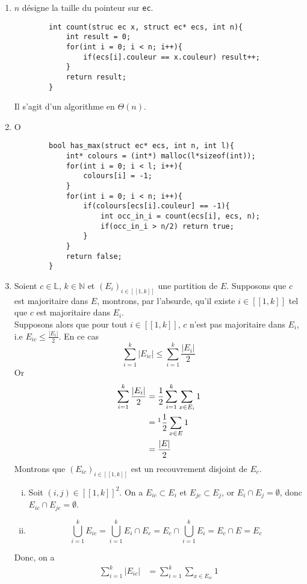 \documentclass[10pt]{article}
\newcommand{\f}[1]{\texttt{#1}}
\def\N{\mathbb N}
\def\L{\mathbb L}
\begin{document}
	\begin{enumerate}[start=9,label={\bfseries \arabic*}]
		\item $n$ désigne la taille du pointeur sur \f{ec}.


		\begin{lstlisting}
		int count(struc ec x, struct ec* ecs, int n){
			int result = 0;
			for(int i = 0; i < n; i++){
				if(ecs[i].couleur == x.couleur) result++;
			}
			return result;
		}
		\end{lstlisting}
		Il s'agit d'un algorithme en $\Theta(n)$.
		\item O
		\begin{lstlisting}
		bool has_max(struct ec* ecs, int n, int l){
			int* colours = (int*) malloc(l*sizeof(int));
			for(int i = 0; i < l; i++){
				colours[i] = -1;
			}
			for(int i = 0; i < n; i++){
				if(colours[ecs[i].couleur] == -1){
					int occ_in_i = count(ecs[i], ecs, n);
					if(occ_in_i > n/2) return true;
				}
			}
			return false;
		}
		\end{lstlisting}
		\item Soient $c\in\L$, $k\in\N$ et $(E_i)_{i\in [\![1, k]\!]}$ une partition de $E$. Supposons que $c$ est majoritaire dans $E$, montrons, par l'absurde, qu'il existe $i\in[\![1, k]\!]$ tel que $c$ est majoritaire dans $E_i$.\\
		Supposons alors que pour tout $i\in[\![1, k]\!]$, $c$ n'est pas majoritaire dans $E_i$, i.e $E_{ic}\leq \frac{|E_i|}2$. En ce cas \[\sum_{i=1}^k|E_{ic}|\leq \sum_{i=1}^k \frac{|E_i|}2 \tag{1}\]
		Or
		\begin{align*}
			\sum_{i=1}^k \frac{|E_i|}2 &= \frac12\sum_{i=1}^k\sum_{x\in E_i}1\\
									   &=\footnotemark[1] \frac12\sum_{x\in E}1\\
									   &= \frac{|E|}2
		\end{align*}
		Montrons que $(E_{ic})_{i\in[\![1, k]\!]}$ est un recouvrement disjoint de $E_c$.
		\begin{enumerate}[(i)]
			\item Soit $(i, j)\in[\![1, k]\!]^2$. On a $E_{ic}\subset E_i$ et $E_{jc}\subset E_j$, or $E_i\cap E_j=\emptyset$, donc $E_{ic}\cap E_{jc}=\emptyset$.
			\item \[\bigcup_{i=1}^kE_{ic}=\bigcup_{i=1}^kE_i\cap E_c=E_c\cap\bigcup_{i=1}^kE_i=E_c\cap E= E_c\]
		\end{enumerate}
		Donc, on a 
		\begin{align*}
			\sum_{i=1}^k |E_{ic}| &= \sum_{i=1}^k\sum_{x\in E_{ic}}1\\

\end{align*}
\end{enumerate}
\end{document}
